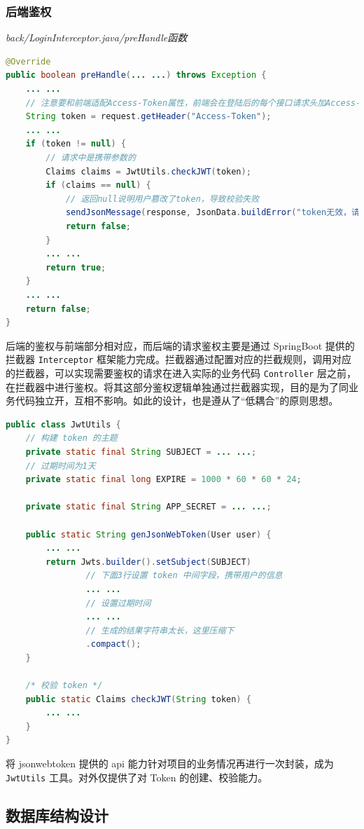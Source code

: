 \subsubsection{后端鉴权}
\noindent\textit{back/LoginInterceptor.java/preHandle函数}
\begin{lstlisting}[language=Java]
@Override
public boolean preHandle(... ...) throws Exception {
    ... ...
    // 注意要和前端适配Access-Token属性，前端会在登陆后的每个接口请求头加Access-Token属性
    String token = request.getHeader("Access-Token");
    ... ...
    if (token != null) {
        // 请求中是携带参数的
        Claims claims = JwtUtils.checkJWT(token);
        if (claims == null) {
            // 返回null说明用户篡改了token，导致校验失败
            sendJsonMessage(response, JsonData.buildError("token无效，请重新登录"));
            return false;
        }
        ... ...
        return true;
    }
    ... ...
    return false;
}
\end{lstlisting}
后端的鉴权与前端部分相对应，而后端的请求鉴权主要是通过 SpringBoot 提供的拦截器 \lstinline!Interceptor! 框架能力完成。拦截器通过配置对应的拦截规则，调用对应的拦截器，可以实现需要鉴权的请求在进入实际的业务代码 \lstinline!Controller! 层之前，在拦截器中进行鉴权。将其这部分鉴权逻辑单独通过拦截器实现，目的是为了同业务代码独立开，互相不影响。如此的设计，也是遵从了“低耦合”的原则思想。
\begin{lstlisting}[language=Java]
public class JwtUtils {
    // 构建 token 的主题
    private static final String SUBJECT = ... ...;
    // 过期时间为1天
    private static final long EXPIRE = 1000 * 60 * 60 * 24;

    private static final String APP_SECRET = ... ...;

    public static String genJsonWebToken(User user) {
        ... ...
        return Jwts.builder().setSubject(SUBJECT)
                // 下面3行设置 token 中间字段，携带用户的信息
                ... ...
                // 设置过期时间
                ... ...
                // 生成的结果字符串太长，这里压缩下
                .compact();
    }

    /* 校验 token */
    public static Claims checkJWT(String token) {
        ... ...
    }
}
\end{lstlisting}

将 jsonwebtoken 提供的 api 能力针对项目的业务情况再进行一次封装，成为 \lstinline!JwtUtils! 工具。对外仅提供了对 Token 的创建、校验能力。


\subsection{数据库结构设计}
